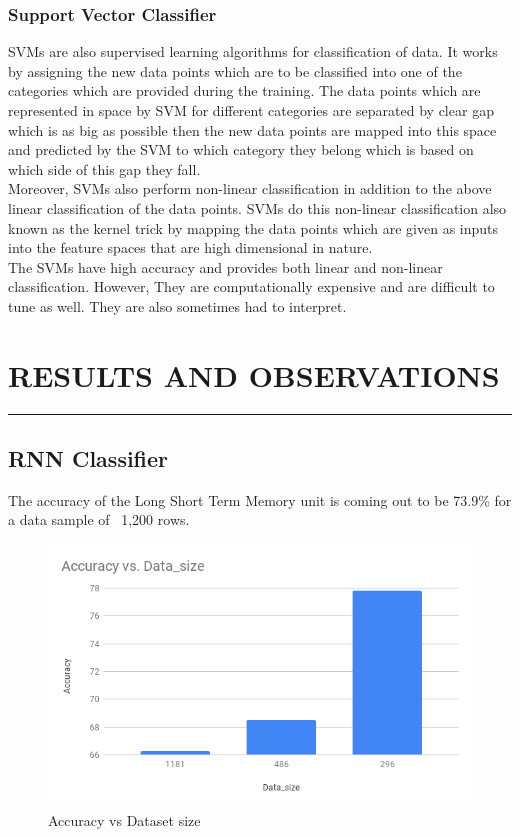 \documentclass[a4paper,11pt]{article}
\begin{document}
\subsubsection{Support Vector Classifier}

SVMs are also supervised learning algorithms for classification of data. It works by assigning the new data points which are to be classified into one of the categories which are provided during the training. The data points which are represented in space by SVM for different categories are separated by clear gap which is as big as possible then the new data points are mapped into this space and predicted by the SVM to which category they belong which is based on which side of this gap they fall.
\medskip\\
Moreover, SVMs also perform non-linear classification in addition to the above linear classification of the data points. SVMs do this non-linear classification also known as the kernel trick by mapping the data points which are given as inputs into the feature spaces that are high dimensional in nature.
\medskip\\
The SVMs have high accuracy and provides both linear and non-linear classification. 
However, They are computationally expensive and are difficult to tune as well. They are also sometimes had to interpret.\cite{jakkula2006tutorial}
\newpage

\section{RESULTS AND OBSERVATIONS}
\hrule
\vspace*{5mm}
\subsection{RNN Classifier}
The accuracy of the Long Short Term Memory unit is coming out to be 73.9\% for a data sample of ~1,200 rows.
\begin{figure}[ht]
\includegraphics[width=\linewidth]{x1.png}
\caption{Accuracy vs Dataset size}
\end{figure}
\end{document}
